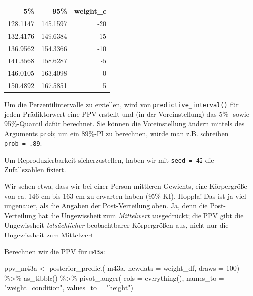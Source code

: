 \documentclass[
  a4paper,
  DIV=11]{scrreprt}
\newenvironment{Shaded}{\begin{snugshade}}{\end{snugshade}}
\newcommand{\AttributeTok}[1]{\textcolor[rgb]{0.40,0.45,0.13}{#1}}
\newcommand{\DecValTok}[1]{\textcolor[rgb]{0.68,0.00,0.00}{#1}}
\newcommand{\FunctionTok}[1]{\textcolor[rgb]{0.28,0.35,0.67}{#1}}
\newcommand{\NormalTok}[1]{\textcolor[rgb]{0.00,0.23,0.31}{#1}}
\newcommand{\OtherTok}[1]{\textcolor[rgb]{0.00,0.23,0.31}{#1}}
\newcommand{\SpecialCharTok}[1]{\textcolor[rgb]{0.37,0.37,0.37}{#1}}
\newcommand{\StringTok}[1]{\textcolor[rgb]{0.13,0.47,0.30}{#1}}
\theoremstyle{definition}
\theoremstyle{remark}
\begin{document}
\begin{longtable}[]{@{}rrr@{}}
\toprule()
5\% & 95\% & weight\_c \\
\midrule()
\endhead
128.1147 & 145.1597 & -20 \\
132.4176 & 149.6384 & -15 \\
136.9562 & 154.3366 & -10 \\
141.3568 & 158.6287 & -5 \\
146.0105 & 163.4098 & 0 \\
150.4892 & 167.5851 & 5 \\
\bottomrule()
\end{longtable}

Um die Perzentilintervalle zu erstellen, wird von
\texttt{predictive\_interval()} für jeden Prädiktorwert eine PPV
erstellt und (in der Voreinstellung) das 5\%- sowie 95\%-Quantil dafür
berechnet. Sie können die Voreinstellung ändern mittels des Arguments
\texttt{prob}; um ein 89\%-PI zu berechnen, würde man z.B. schreiben
\texttt{prob\ =\ .89}.

Um Reproduzierbarkeit sicherzustellen, haben wir mit
\texttt{seed\ =\ 42} die Zufallszahlen fixiert.

Wir sehen etwa, dass wir bei einer Person mittleren Gewichts, eine
Körpergröße von ca. 146 cm bis 163 cm zu erwarten haben (95\%-KI).
Hoppla! Das ist ja viel ungenauer, als die Angaben der Post-Verteilung
oben. Ja, denn die Post-Verteilung hat die Ungewissheit zum
\emph{Mittelwert} ausgedrückt; die PPV gibt die Ungewissheit
\emph{tatsächlicher} beobachtbarer Körpergrößen aus, nicht nur die
Ungewissheit zum Mittelwert.

Berechnen wir die PPV für \texttt{m43a}:

\begin{Shaded}
\begin{Highlighting}[]
\NormalTok{ppv\_m43a }\OtherTok{\textless{}{-}} \FunctionTok{posterior\_predict}\NormalTok{(}
\NormalTok{  m43a,}
  \AttributeTok{newdata =}\NormalTok{ weight\_df,}
  \AttributeTok{draws =} \DecValTok{100}\NormalTok{) }\SpecialCharTok{\%\textgreater{}\%} 
  \FunctionTok{as\_tibble}\NormalTok{() }\SpecialCharTok{\%\textgreater{}\%} 
  \FunctionTok{pivot\_longer}\NormalTok{(}
    \AttributeTok{cols =} \FunctionTok{everything}\NormalTok{(),}
    \AttributeTok{names\_to =} \StringTok{"weight\_condition"}\NormalTok{,}
    \AttributeTok{values\_to =} \StringTok{"height"}\NormalTok{)}
\end{Highlighting}
\end{Shaded}
\end{document}
